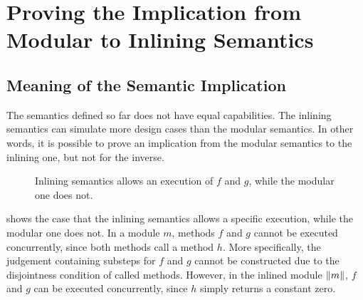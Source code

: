 \chapter{Proving the Implication from Modular to Inlining Semantics}
\label{chap:implication}

\section{Meaning of the Semantic Implication}

The semantics defined so far does not have equal capabilities. The
inlining semantics can simulate more design cases than the modular
semantics. In other words, it is possible to prove an implication from
the modular semantics to the inlining one, but not for the inverse.

\begin{figure}[t]
  \begin{subfigure}[b]{0.5\textwidth}
  \end{subfigure}
  \begin{subfigure}[b]{0.5\textwidth}
  \end{subfigure}
  \caption{Inlining semantics allows an execution of $f$ and $g$,
    while the modular one does not.}
  \label{ex-inlining-covers-more}
\end{figure}

 shows the case that the inlining
semantics allows a specific execution, while the modular one does
not. In a module $m$, methods $f$ and $g$ cannot be executed
concurrently, since both methods call a method $h$. More specifically,
the \Substeps{} judgement containing substeps for $f$ and $g$ cannot
be constructed due to the disjointness condition of called
methods. However, in the inlined module $\| m \|$, $f$ and $g$ can
be executed concurrently, since $h$ simply returns a constant zero.

